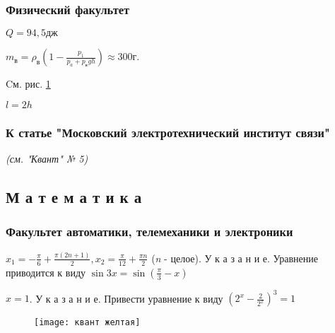 \subsubsection*{Физический факультет}

\begin{enums}
	\item $Q = 94,5\textit{дж}$
	\item \begin{math}
		m_\textit{в} = \rho_\textit{в} (1 - \frac{p_1}{p_a + p_\textit{в}gh})\approx 300 \textit{г.}
	\end{math}
	\item Cм. рис. \ref{Ris1}
	\item $l = 2h$
\end{enums}

\subsubsection*{К статье "Московский электротехнический институт связи"}
\begin{center}
	\textit{(см. "Квант" № 5)}
\end{center}

\subsection*{М а т е м а т и к а}
\subsubsection*{Факультет автоматики, телемеханики и электроники}

\begin{enums}
	\item \begin{math}
		x_1 = - \frac{\pi}{6} + \frac{\pi (2n + 1)}{2}, x_2 = \frac{\pi}{12} + \frac{\pi n}{2}
	\end{math}
	(\textit{n} - целое). У к а з а н и е. Уравнение приводится к виду \begin{math}
		\sin{3x} = \sin{(\frac{\pi}{3} - x)}
	\end{math}
	\item $x=1$. У к а з а н и е. Привести уравнение к виду $(2^x - \frac{2}{2^x})^3 = 1$
\end{enums}
\begin{figure}[h]
	\centering
	\texttt{[image: квант желтая]}
	\vspace*{0pt}
	\caption{}\label{Ris1}
\end{figure}
\onecolumn